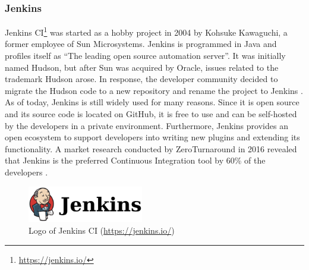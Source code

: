 
\subsubsection{Jenkins}
Jenkins CI\footnote{\url{https://jenkins.io/}} was started as a hobby project in 2004 by Kohsuke Kawaguchi, a former employee of Sun Microsystems. Jenkins is programmed in Java and profiles itself as ``The leading open source automation server''. It was initially named Hudson, but after Sun was acquired by Oracle, issues related to the trademark Hudson arose. In response, the developer community decided to migrate the Hudson code to a new repository and rename the project to Jenkins \cite{SmartJenkinsDefinitive}. As of today, Jenkins is still widely used for many reasons. Since it is open source and its source code is located on GitHub, it is free to use and can be self-hosted by the developers in a private environment. Furthermore, Jenkins provides an open ecosystem to support developers into writing new plugins and extending its functionality. A market research conducted by ZeroTurnaround in 2016 revealed that Jenkins is the preferred Continuous Integration tool by 60\% of the developers \cite{maple_2016}.

\begin{figure}[htbp!]
	\centering
	\includegraphics[width=0.45\textwidth]{assets/jenkins.pdf}
	\caption{Logo of Jenkins CI (\url{https://jenkins.io/})}
	\label{fig:jenkins}
\end{figure}